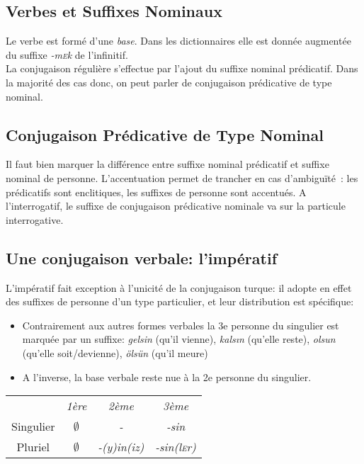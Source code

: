 \documentclass{cours}
\newcommand{\sce}{\textsc{e}}
\begin{document}
\subsection{Verbes et Suffixes Nominaux}
Le verbe est formé d'une \emph{base}. Dans les dictionnaires elle est donnée augmentée du suffixe \textsl{-m\sce k} de l'infinitif.\\
La conjugaison régulière s'effectue par l'ajout du suffixe nominal prédicatif. Dans la majorité des cas donc, on peut parler de conjugaison prédicative de type nominal.

\subsection{Conjugaison Prédicative de Type Nominal}
Il faut bien marquer la différence entre suffixe nominal prédicatif et suffixe nominal de personne. L'accentuation permet de trancher en cas d'ambiguïté~: les prédicatifs sont enclitiques, les suffixes de personne sont accentués. A l'interrogatif, le suffixe de conjugaison prédicative nominale va sur la particule interrogative.

\subsection{Une conjugaison verbale: l'impératif}
L'impératif fait exception à l'unicité de la conjugaison turque: il adopte en effet des suffixes de personne d'un type particulier, et leur distribution est spécifique:
\begin{itemize}
    \item Contrairement aux autres formes verbales la 3e personne du singulier est marquée par un suffixe: \textsl{gelsin} (qu'il vienne), \textsl{kals\i n} (qu'elle reste), \textsl{olsun} (qu'elle soit/devienne), \textsl{ölsün} (qu'il meure)
    \item A l'inverse, la base verbale reste nue à la 2e personne du singulier.
\end{itemize}
\begin{center}
    \begin{tabular}{c>{\sl}c>{\sl}c>{\sl}c}
                  & 1ère        & 2ème       & 3ème          \\
        Singulier & $\emptyset$ & -          & -sin          \\
        Pluriel   & $\emptyset$ & -(y)in(iz) & -sin(l\sce r)
    \end{tabular}
\end{center}
\end{document}
